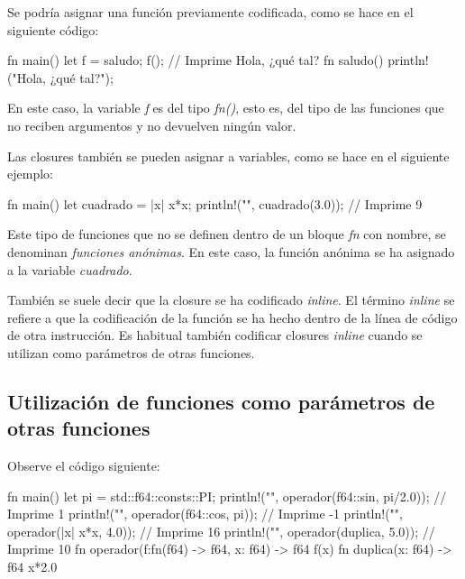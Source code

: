 Se podría asignar una función previamente codificada, como se hace en el siguiente código:

\vspace{0.7em}
\begin{Codigo}
   fn main() {
      let f = saludo;
      f(); // Imprime Hola, ¿qué tal?
   }
   fn saludo() {
      println!("Hola, ¿qué tal?");
   }
\end{Codigo}

En este caso, la variable \textit{f} es del tipo \textit{fn()}, esto es, del tipo de las funciones que no reciben argumentos y no devuelven ningún valor.

Las closures también se pueden asignar a variables, como se hace en el siguiente ejemplo:

\vspace{0.7em}
\begin{Codigo}
   fn main() {
      let cuadrado = |x| x*x;
      println!("{}", cuadrado(3.0)); // Imprime 9
   }
\end{Codigo}

Este tipo de funciones que no se definen dentro de un bloque \textit{fn} con nombre, se denominan \textit{funciones anónimas}. En este caso, la función anónima se ha asignado a la variable \textit{cuadrado}. 

También se suele decir que la closure se ha codificado \textit{inline}. El término \textit{inline} se refiere a que la codificación de la función se ha hecho dentro de la línea de código de otra instrucción. Es habitual también codificar closures \textit{inline} cuando se utilizan como parámetros de otras funciones.

\pagebreak
\subsection{Utilización de funciones como parámetros de otras funciones}
\noindent Observe el código siguiente:

\vspace{0.7em}
\begin{Codigo}
   fn main() {
      let pi = std::f64::consts::PI;
      println!("{}", operador(f64::sin, pi/2.0)); // Imprime 1
      println!("{}", operador(f64::cos, pi)); // Imprime -1
      println!("{}", operador(|x| x*x, 4.0)); // Imprime 16
      println!("{}", operador(duplica, 5.0)); // Imprime 10
   }
   fn operador(f:fn(f64) -> f64, x: f64) -> f64 {
      f(x)
   }
   fn duplica(x: f64) -> f64 {
      x*2.0
   }
\end{Codigo}

